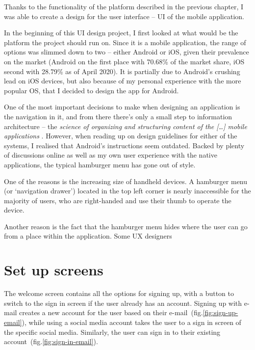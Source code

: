 Thanks to the functionality of the platform described in the previous chapter, I was able to create a design for the user interface -- UI of the mobile application.

In the beginning of this UI design project, I first looked at what would be the platform the project should run on.
Since it is a mobile application, the range of options was slimmed down to two -- either Android or iOS,
given their prevalence on the market (Android on the first place with 70.68\% of the market share, iOS second with 28.79\% as of April 2020). \cite{market-share-mobile-os}
It is partially due to Android's crushing lead on iOS devices, but also because of my personal experience with the more popular OS, that I decided to design the app for Android.

One of the most important decisions to make when designing an application is the navigation in it, and from there there's only a small step to information architecture -- the \textit{science of organizing and structuring content of the [\dots] mobile applications} \cite{information-architecture}.
However, when reading up on design guidelines for either of the systems, I realised that Android's instructions seem outdated.
Backed by plenty of discussions online as well as my own user experience with the native applications, the typical hamburger menu has gone out of style.

One of the reasons is the increasing size of handheld devices.
A hamburger menu (or `navigation drawer') located in the top left corner is nearly inaccessible for the majority of users, who are right-handed and use their thumb to operate the device. \cite{thumb-zone-article} 

Another reason is the fact that the hamburger menu hides where the user can go from a place within the application.
Some UX designers 

\section{Set up screens}
The welcome screen contains all the options for signing up, with a button to switch to the sign in screen if the user already has an account.
Signing up with e-mail creates a new account for the user based on their e-mail~(fig.\ref{fig:sign-up-email}), while using a social media account takes the user to a sign in screen of the specific social media.
Similarly, the user can sign in to their existing account~(fig.\ref{fig:sign-in-email}).

